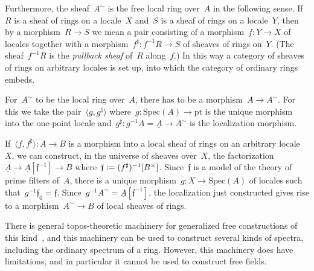 \documentclass{ws-rv9x6}
\newcommand{\fff}{\mathfrak{f}}
\newcommand{\defeq}{\vcentcolon=}
\newcommand{\Spec}{\mathrm{Spec}}
\renewcommand{\_}{\mathpunct{.}}
\newcommand{\?}{\,{:}\,}
\newcommand{\pt}{\mathrm{pt}}
\begin{document}
Furthermore, the sheaf~$A^\sim$ is the free local ring over~$A$ in the
following sense. If~$R$ is a sheaf of rings on a locale~$X$ and~$S$ is a sheaf
of rings on a locale~$Y$, then by a morphism~$R \to S$ we mean a pair
consisting of a morphism~$f : Y \to X$ of locales together with a
morphism~$f^\sharp : f^{-1}R \to S$ of sheaves of rings on~$Y$. (The
sheaf~$f^{-1}R$ is the \emph{pullback sheaf} of~$R$ along~$f$.)
In this way a category of sheaves of rings on arbitrary locales is set up, into
which the category of ordinary rings embeds.

For~$A^\sim$ to be the local ring over~$A$, there has to be a morphism~$A \to
A^\sim$. For this we take the pair~$\langle g, g^\sharp \rangle$ where~$g :
\Spec(A) \to \pt$ is the unique morphism into the one-point locale
and~$g^\sharp : g^{-1}A = \underline{A} \to A^\sim$ is the localization
morphism.

If~$\langle f,f^\sharp \rangle : A \to B$ is a morphism into a local sheaf of
rings on an arbitrary locale~$X$, we can construct, in the universe of sheaves
over~$X$, the factorization~$\underline{A} \to
\underline{A}[\fff^{-1}] \to B$ where~$\fff \defeq
(f^\sharp)^{-1}[B^\times]$. Since~$\fff$ is a model of the theory of prime
filters of~$A$, there is a unique morphism~$g : X \to \Spec(A)$ of locales such
that~$g^{-1}\fff_0 = \fff$. Since~$g^{-1}A^\sim = \underline{A}[\fff^{-1}]$,
the localization just constructed gives rise to a morphism~$A^\sim \to B$ of
local sheaves of rings.

\begin{remark}There is general topos-theoretic machinery for generalized free
constructions of this kind~\cite{coste:sheaf-representation,cole:spectra}, and
this machinery can be used to construct several kinds of spectra, including the
ordinary spectrum of a ring. However, this machinery does have limitations, and
in particular it cannot be used to construct free fields.
\end{remark}
\end{document}
